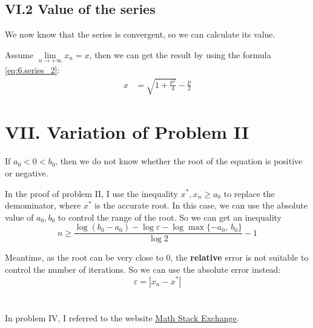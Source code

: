 \documentclass[a4paper]{article}
\begin{document}
\subsection*{VI.2 Value of the series}

We now know that the series is convergent, so we can calculate its value.

Assume $\lim\limits_{n \to +\infty} x_n = x$, then we can get the result by using the formula \ref{eq:6.series_2}:
\begin{equation}
    \begin{aligned}
        x &= \sqrt{1 + \frac{p^2}{4}} - \frac{p}{2}
    \end{aligned}
    \label{eq:6.value}
\end{equation}

\section*{VII. Variation of Problem II}

If $a_0 < 0 < b_0$, then we do not know whether the root of the equation is positive or negative. 

In the proof of problem II, I use the inequality $x^{*}, x_n \geqslant a_0$ to replace the demominator, where $x^{*}$ is the accurate root.
In this case, we can use the absolute value of $a_0, b_0$ to control the range of the root. So we can get an inequality
\begin{equation}
    n \geqslant \frac{\log(b_0 - a_0) - \log \varepsilon - \log \max\{-a_0,\ b_0\}}{\log 2} - 1
    \label{eq:7.inequality}
\end{equation}

Meantime, as the root can be very close to 0, the \textbf{relative} error is not suitable to control the number of iterations. So we can use the absolute error instead:
\begin{equation}
    \varepsilon = |x_n - x^{*}|
    \label{eq:7.absolute_error}
\end{equation}

\section*{  }
In problem IV, I referred to the website \href{https://math.stackexchange.com/questions/1470990/x-n1-x-n-fx-n-over-fx-0-find-c-and-s-such-that-e-n1-ce-n#:~:text=Consider%20a%20variation%20of%20Newton's%20Method%20in%20which%20only%20one}{Math Stack Exchange}.


\end{document}
